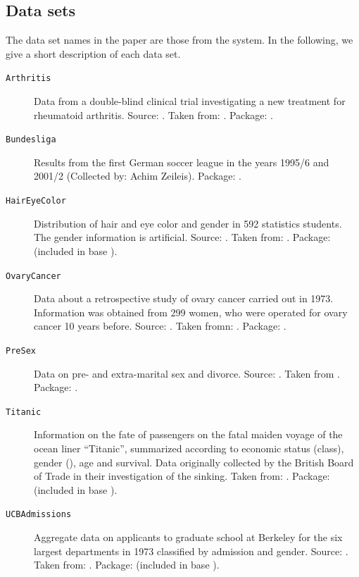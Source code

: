 \documentclass{Z}
\begin{document}


\begin{appendix}

\section{Data sets}
\label{sex:data}

The data set names in the paper are those from the 
system. In the following, we give a short description of each data set.

\begin{description}
\item[\texttt{Arthritis}] Data  from a 
  double-blind clinical trial
  investigating a new treatment for rheumatoid arthritis. 
  Source: \cite{vcd:Koch+Edwards:1988}. Taken from: \cite{vcd:Friendly:2000}.
  Package: .
\item[\texttt{Bundesliga}] Results from the first German soccer league in the
  years 1995/6 \citep{vcd:Knorr-Held:1999} and 2001/2 (Collected by: Achim
  Zeileis). Package: .
\item[\texttt{HairEyeColor}] Distribution of hair and eye color and 
  gender in 592 statistics
  students. The gender information is artificial. Source: \cite{vcd:Snee:1974}.
  Taken from: \cite{vcd:Friendly:2000}. 
  Package:  (included in base ).
\item[\texttt{OvaryCancer}]  Data about a retrospective study of ovary cancer
     carried out in 1973.  Information was obtained from 299 women, who
     were operated for ovary cancer 10 years before. Source:
     \cite{vcd:obel:1975}. Taken fromn: \cite{vcd:andersen:1991}. Package: .
\item[\texttt{PreSex}]  Data on pre- and extra-marital sex and divorce. 
  Source: \cite{vcd:thornes+collard:1979}. Taken from \cite{vcd:gilbert:1981}.
  Package: .
\item[\texttt{Titanic}] Information on the fate of passengers on
  the fatal maiden voyage of the ocean liner ``Titanic'', summarized
  according to economic status (class), gender (), age and
  survival. Data originally collected by the British Board of Trade
  in their investigation of the sinking. Taken from: \cite{vcd:dawson:1995}.
  Package:  (included in base ).
\item[\texttt{UCBAdmissions}] 
  Aggregate data on applicants to graduate school at Berkeley for
  the six largest departments in 1973 classified by admission and
  gender. Source: \cite{vcd:Bickel+Hammel+O'Connell:1975}. 
  Taken from: \cite{vcd:Friendly:2000}.
  Package:  (included in base ).
\end{description}

\end{appendix}
\end{document}
